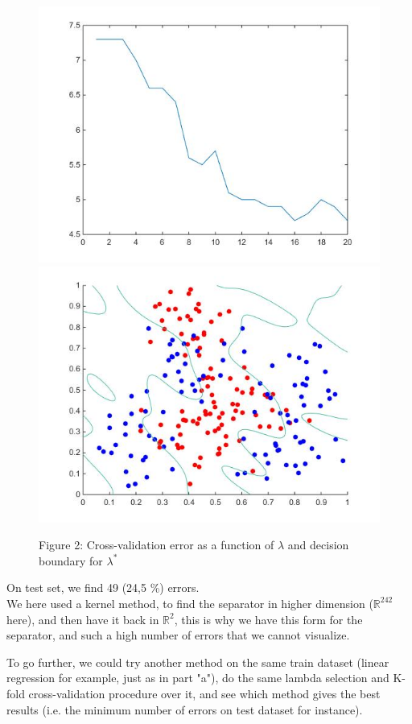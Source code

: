 \documentclass[a4paper, 12pt]{article}
\begin{document}
\begin{figure}[!htbp]
\centering
\noindent\includegraphics[scale=0.4]{images/ass1-img4.jpg}
\noindent\includegraphics[scale=0.4]{images/ass1-img5.jpg}
\caption{Figure 2: Cross-validation error as a function of $\lambda$ and decision boundary for $\lambda^{*}$}
\end{figure}

On test set, we find 49 (24,5 \%) errors.
\\We here used a kernel method, to find the separator in higher dimension ($\mathbb{R}^{242}$ here), and then have it back in $\mathbb{R}^{2}$, this is why we have this form for the separator, and such a high number of errors that we cannot visualize.

To go further, we could try another method on the same train dataset (linear regression for example, just as in part "a"), do the same lambda selection and K-fold cross-validation procedure over it, and see which method gives the best results (i.e. the minimum number of errors on test dataset for instance).
\end{document}
